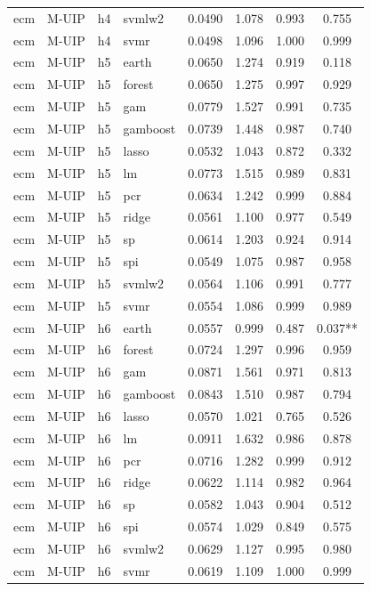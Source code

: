 \begin{ThreePartTable}
\begin{longtable}[t]{llclcccc}
ecm & M-UIP & h4 & svmlw2 & 0.0490 & 1.078 & 0.993 & 0.755\\
ecm & M-UIP & h4 & svmr & 0.0498 & 1.096 & 1.000 & 0.999\\
\addlinespace
ecm & M-UIP & h5 & earth & 0.0650 & 1.274 & 0.919 & 0.118\\
ecm & M-UIP & h5 & forest & 0.0650 & 1.275 & 0.997 & 0.929\\
ecm & M-UIP & h5 & gam & 0.0779 & 1.527 & 0.991 & 0.735\\
ecm & M-UIP & h5 & gamboost & 0.0739 & 1.448 & 0.987 & 0.740\\
ecm & M-UIP & h5 & lasso & 0.0532 & 1.043 & 0.872 & 0.332\\
ecm & M-UIP & h5 & lm & 0.0773 & 1.515 & 0.989 & 0.831\\
ecm & M-UIP & h5 & pcr & 0.0634 & 1.242 & 0.999 & 0.884\\
ecm & M-UIP & h5 & ridge & 0.0561 & 1.100 & 0.977 & 0.549\\
ecm & M-UIP & h5 & sp & 0.0614 & 1.203 & 0.924 & 0.914\\
ecm & M-UIP & h5 & spi & 0.0549 & 1.075 & 0.987 & 0.958\\
ecm & M-UIP & h5 & svmlw2 & 0.0564 & 1.106 & 0.991 & 0.777\\
ecm & M-UIP & h5 & svmr & 0.0554 & 1.086 & 0.999 & 0.989\\
\addlinespace
ecm & M-UIP & h6 & earth & 0.0557 & 0.999 & 0.487 & 0.037**\\
ecm & M-UIP & h6 & forest & 0.0724 & 1.297 & 0.996 & 0.959\\
ecm & M-UIP & h6 & gam & 0.0871 & 1.561 & 0.971 & 0.813\\
ecm & M-UIP & h6 & gamboost & 0.0843 & 1.510 & 0.987 & 0.794\\
ecm & M-UIP & h6 & lasso & 0.0570 & 1.021 & 0.765 & 0.526\\
ecm & M-UIP & h6 & lm & 0.0911 & 1.632 & 0.986 & 0.878\\
ecm & M-UIP & h6 & pcr & 0.0716 & 1.282 & 0.999 & 0.912\\
ecm & M-UIP & h6 & ridge & 0.0622 & 1.114 & 0.982 & 0.964\\
ecm & M-UIP & h6 & sp & 0.0582 & 1.043 & 0.904 & 0.512\\
ecm & M-UIP & h6 & spi & 0.0574 & 1.029 & 0.849 & 0.575\\
ecm & M-UIP & h6 & svmlw2 & 0.0629 & 1.127 & 0.995 & 0.980\\
ecm & M-UIP & h6 & svmr & 0.0619 & 1.109 & 1.000 & 0.999\\

\end{longtable}
\end{ThreePartTable}
